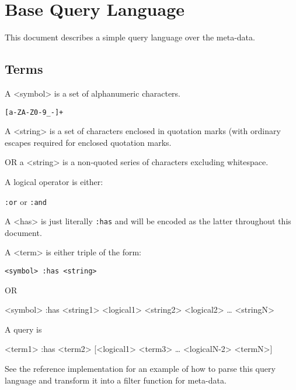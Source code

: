 \documentclass[11pt]{article}
\author{Vincent Toups}
\date{\today}
\title{}
\begin{document}
\tableofcontents

\section{Base Query Language}
\label{sec:org8656b91}

This document describes a simple query language over the meta-data.

\subsection{Terms}
\label{sec:orgca1beea}

A <symbol> is a set of alphanumeric characters.

\begin{verbatim}
[a-ZA-Z0-9_-]+
\end{verbatim}

A <string> is a set of characters enclosed in quotation marks (with
ordinary escapes required for enclosed quotation marks.

OR a <string> is a non-quoted series of characters excluding
whitespace.

A logical operator is either:

\texttt{:or} or \texttt{:and}

A <has> is just literally \texttt{:has} and will be encoded as the latter
throughout this document. 

A <term> is either triple of the form:

\texttt{<symbol> :has <string>}

OR

<symbol> :has <string1> <logical1> <string2> <logical2>
\ldots{} <stringN>

A query is

<term1> :has <term2> [<logical1> <term3> \ldots{} <logicalN-2> <termN>]

See the reference implementation for an example of how to parse this
query language and transform it into a filter function for meta-data.
\end{document}
